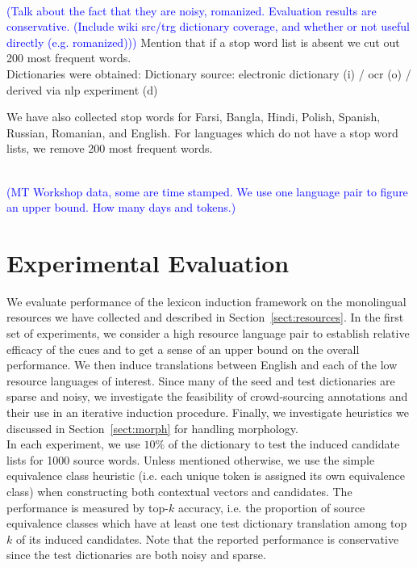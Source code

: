 \documentclass{article}
\newcommand{\mnote}[1]{\marginpar{%
  \vskip-\baselineskip
  \raggedright\footnotesize
  \itshape\hrule\smallskip\tiny{#1}\par\smallskip\hrule}}
\newcommand{\todo}[1]{\textcolor{blue}{(#1)}}
\newcommand{\mtodo}[1]{\mnote{\textcolor{red}{#1}}}
\newcommand{\secref}[1]{Section~\ref{#1}}
\begin{document}
\mtodo{Note: Be's runs used an older crawl April.}

\\ 


\todo{Talk about the fact that they are noisy, romanized.  Evaluation results are conservative.  \todo{Include wiki src/trg dictionary coverage, and whether or not useful directly (e.g. romanized)}} Mention that if a stop word list is absent we cut out 200 most frequent words.\\

Dictionaries were obtained: Dictionary source: electronic dictionary (i) / ocr (o) / derived via nlp experiment (d)

We have also collected stop words for Farsi, Bangla, Hindi, Polish, Spanish, Russian, Romanian, and English.  For languages which do not have a stop word lists, we remove 200 most frequent words.


\\

\todo{MT Workshop data, some are time stamped.  We use one language pair to figure an upper bound. How many days and tokens.}\\

\section{Experimental Evaluation}

We evaluate performance of the lexicon induction framework on the monolingual resources we have collected and described in \secref{sect:resources}.  In the first set of experiments, we consider a high resource language pair to establish relative efficacy of the cues and to get a sense of an upper bound on the overall performance. We then induce translations between English and each of the low resource languages of interest.  Since many of the seed and test dictionaries are sparse and noisy, we investigate the feasibility of crowd-sourcing annotations and their use in an iterative induction procedure.  Finally, we investigate heuristics we discussed in \secref{sect:morph} for handling morphology.\\

In each experiment, we use $10\%$ of the dictionary to test the induced candidate lists for 1000 source words.  Unless mentioned otherwise, we use the simple equivalence class heuristic (i.e. each unique token is assigned its own equivalence class) when constructing both contextual vectors and candidates.  The performance is measured by top-$k$ accuracy, i.e. the proportion of source equivalence classes which have at least one test dictionary translation among top $k$ of its induced candidates.  Note that the reported performance is conservative since the test dictionaries are both noisy and sparse.\\
\end{document}
